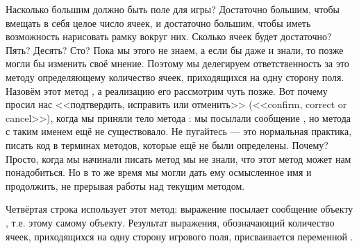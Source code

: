 \documentclass[a4paper,10pt,twoside]{book}
\begin{document}
Насколько большим должно быть поле для игры? Достаточно большим, чтобы вмещать в себя целое число ячеек, и достаточно большим, чтобы иметь возможность нарисовать рамку вокруг них.
Сколько ячеек будет достаточно? Пять? Десять? Сто? Пока мы этого не знаем, а если бы даже и знали, то позже могли бы изменить своё мнение. Поэтому мы делегируем ответственность за это методу определяющему количество ячеек, приходящихся на одну сторону поля. Назовём этот метод , а реализацию его рассмотрим чуть позже.
Вот почему \pharo просил нас <<подтвердить, исправить или отменить>> (<<confirm, correct or cancel>>), когда мы приняли тело метода : мы посылали сообщение , но метода с таким именем ещё не существовало.
Не пугайтесь --- это нормальная практика, писать код в терминах методов, которые ещё не были определены.
Почему? Просто, когда мы начинали писать метод  мы не знали, что этот метод может нам понадобиться. Но в то же время мы могли дать ему осмысленное имя и продолжить, не прерывая работы над текущим методом.
 
Четвёртая строка использует этот метод:
выражение  посылает сообщение  объекту , т.е. этому самому объекту.
Результат выражения, обозначающий количество ячеек, приходящихся на одну сторону игрового поля, присваивается переменной .
\end{document}
